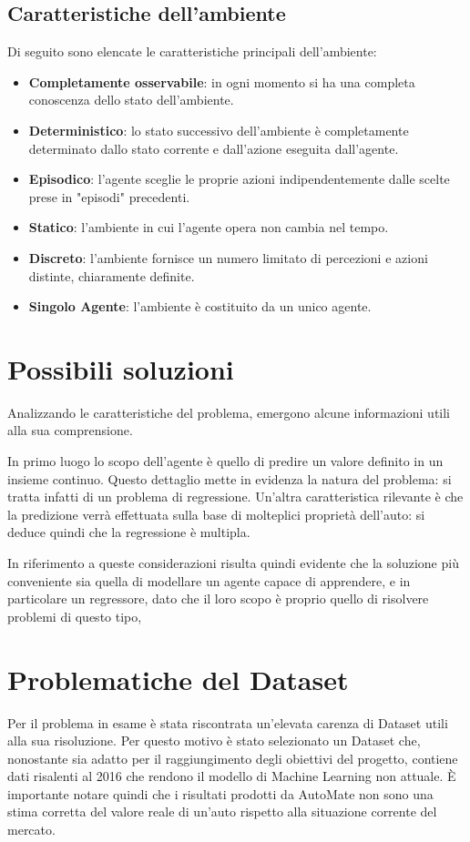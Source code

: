 \subsection{Caratteristiche dell'ambiente}
Di seguito sono elencate le caratteristiche principali dell'ambiente:
\begin{itemize}
    \item \textbf{Completamente osservabile}: in ogni momento si ha una completa conoscenza dello stato dell'ambiente.
    \item \textbf{Deterministico}: lo stato successivo dell’ambiente è completamente determinato dallo stato corrente e dall’azione eseguita dall’agente.
    \item \textbf{Episodico}: l'agente sceglie le proprie azioni indipendentemente dalle scelte prese in "episodi" precedenti.
    \item \textbf{Statico}: l'ambiente in cui l'agente opera non cambia nel tempo.
    \item \textbf{Discreto}: l'ambiente fornisce un numero limitato di percezioni e azioni distinte, chiaramente definite.
    \item \textbf{Singolo Agente}: l'ambiente è costituito da un unico agente.
\end{itemize}

\medskip
\section{Possibili soluzioni}
Analizzando le caratteristiche del problema, emergono alcune informazioni utili alla sua comprensione.

In primo luogo lo scopo dell'agente è quello di predire un valore definito in un insieme continuo. Questo dettaglio mette in evidenza la natura del problema: si tratta infatti di un problema di regressione.
Un'altra caratteristica rilevante è che la predizione verrà effettuata sulla base di molteplici proprietà dell'auto: si deduce quindi che la regressione è multipla.

In riferimento a queste considerazioni risulta quindi evidente che la soluzione più conveniente sia quella di modellare un agente capace di apprendere, e in particolare un regressore, dato che il loro scopo è proprio quello di risolvere problemi di questo tipo,

\medskip
\section{Problematiche del Dataset}
Per il problema in esame è stata riscontrata un'elevata carenza di Dataset utili alla sua risoluzione. Per questo motivo è stato selezionato un Dataset che, nonostante sia adatto per il raggiungimento degli obiettivi del progetto, contiene dati risalenti al 2016 che rendono il modello di Machine Learning non attuale. È importante notare quindi che i risultati prodotti da AutoMate non sono una stima corretta del valore reale di un'auto rispetto alla situazione corrente del mercato.